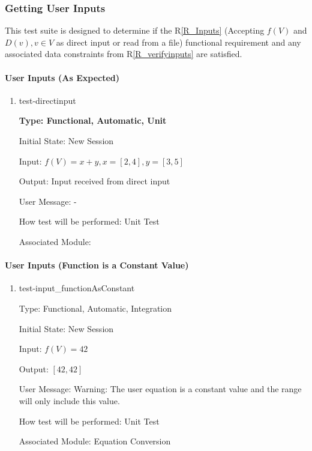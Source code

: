 \documentclass[12pt, titlepage]{article}
\newcommand{\rref}[1]{R\ref{#1}}
\begin{document}
\subsubsection{Getting User Inputs}
\label{tests_gettingInputs}
This test suite is designed to determine if the \rref{R_Inputs} (Accepting 
$f(V)$ and $D(v), v \in V$ as direct input or read from a file) functional 
requirement and any associated data constraints from 
\rref{R_verifyinputs} are satisfied.

\paragraph{User Inputs (As Expected)}

\begin{enumerate}
	
	\item{test-directinput}
	
	\textbf{Type: Functional, Automatic, Unit}
		
		Initial State: New Session
		
		Input: $f(V) = x + y, x = [2,4], y = [3,5]$
		
		Output: Input received from direct input
		
		User Message: - 
		
		How test will be performed: Unit Test
		
		Associated Module: \\

\end{enumerate}
	
\paragraph{User Inputs (Function is a Constant Value)}

\begin{enumerate}	
	\item{test-input\_functionAsConstant}
	
	Type: Functional, Automatic, Integration
	
	Initial State: New Session
	
	Input: $f(V) = 42$
	
	Output:	$[42,42]$
	
	User Message: Warning: The user equation is a constant value and the range 
	will only include this value.
	
	How test will be performed: Unit Test
	
	Associated Module: Equation Conversion\\
\end{enumerate}
	
\end{document}
